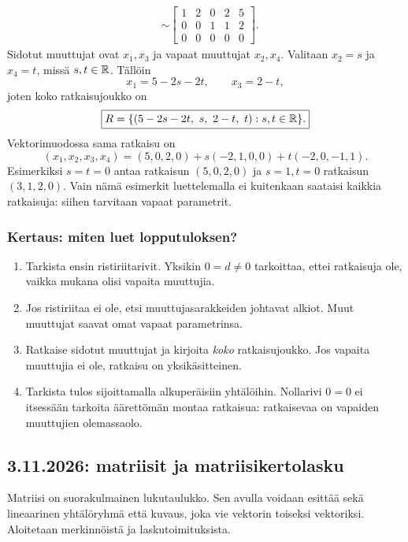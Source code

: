\documentclass[11pt,a4paper]{amsart}
\begin{document}
\begin{example}
\begin{align*}
      &\sim
      \left[
        \begin{array}{rrrr|r}
          1&2&0&2&5\\0&0&1&1&2\\0&0&0&0&0
      \end{array}\right].
    \end{align*}
    Sidotut muuttujat ovat $x_1,x_3$ ja vapaat muuttujat $x_2,x_4$.
    Valitaan $x_2=s$ ja $x_4=t$, missä $s,t\in\mathbb{R}$. Tällöin
    \[
      x_1=5-2s-2t,\qquad x_3=2-t,
    \]
    joten koko ratkaisujoukko on
    \[
      \boxed{R=\{(5-2s-2t,\ s,\ 2-t,\ t):s,t\in\RR\}.}
    \]
    Vektorimuodossa sama ratkaisu on
    \[
      (x_1,x_2,x_3,x_4)
      =(5,0,2,0)+s(-2,1,0,0)+t(-2,0,-1,1).
    \]
    Esimerkiksi $s=t=0$ antaa ratkaisun $(5,0,2,0)$ ja $s=1,t=0$
    ratkaisun $(3,1,2,0)$. Vain nämä esimerkit luettelemalla ei kuitenkaan
    saataisi kaikkia ratkaisuja: siihen tarvitaan vapaat parametrit.
  \end{example}

  \subsubsection*{Kertaus: miten luet lopputuloksen?}
  \begin{enumerate}
    \item Tarkista ensin ristiriitarivit. Yksikin $0=d\ne0$ tarkoittaa,
      ettei ratkaisuja ole, vaikka mukana olisi vapaita muuttujia.
    \item Jos ristiriitaa ei ole, etsi muuttujasarakkeiden johtavat alkiot.
      Muut muuttujat saavat omat vapaat parametrinsa.
    \item Ratkaise sidotut muuttujat ja kirjoita \emph{koko} ratkaisujoukko.
      Jos vapaita muuttujia ei ole, ratkaisu on yksikäsitteinen.
    \item Tarkista tulos sijoittamalla alkuperäisiin yhtälöihin.
      Nollarivi $0=0$ ei itsessään tarkoita äärettömän montaa ratkaisua:
      ratkaisevaa on vapaiden muuttujien olemassaolo.
  \end{enumerate}

  \subsection{3.11.2026: matriisit ja matriisikertolasku}

  Matriisi on suorakulmainen lukutaulukko. Sen avulla voidaan esittää
  sekä lineaarinen yhtälöryhmä että kuvaus, joka vie vektorin toiseksi
  vektoriksi. Aloitetaan merkinnöistä ja laskutoimituksista.
\end{document}
